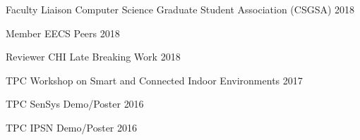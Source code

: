 \begin{cvhonors}

  \cvhonor
    {Faculty Liaison}
    {Computer Science Graduate Student Association (CSGSA)}
    {}
    {2018}

  \cvhonor
    {Member}
    {EECS Peers}
    {} %
    {2018}

  \cvhonor
    {Reviewer}
    {CHI Late Breaking Work}
    {}
    {2018}

  \cvhonor
    {TPC}
    {Workshop on Smart and Connected Indoor Environments}
    {}
    {2017}

  \cvhonor
    {TPC}
    {SenSys Demo/Poster}
    {}
    {2016}

  \cvhonor
    {TPC}
    {IPSN Demo/Poster}
    {}
    {2016}

\end{cvhonors}

